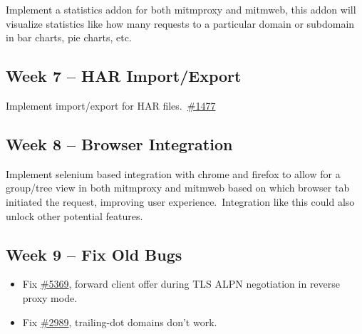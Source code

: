 Implement a statistics addon for both mitmproxy and mitmweb, this addon will visualize statistics like how many
requests to a particular domain or subdomain in bar charts, pie charts, etc.\


\subsection{Week 7 -- HAR Import/Export}
\label{subsec:week-7}

Implement import/export for HAR files.\ \href{https://github.com/mitmproxy/mitmproxy/issues/1477}{\#1477}


\subsection{Week 8 -- Browser Integration}
\label{subsec:week-8}

Implement selenium based integration with chrome and firefox to allow for a group/tree view in both mitmproxy and
mitmweb based on which browser tab initiated the request, improving user experience.\ Integration like this could
also unlock other potential features.


\subsection{Week 9 -- Fix Old Bugs}
\label{subsec:week-9}

\begin{itemize}

    \item Fix \href{https://github.com/mitmproxy/mitmproxy/issues/5369}{\#5369}, forward client offer during TLS
    ALPN negotiation in reverse proxy mode.\

    \item Fix \href{https://github.com/mitmproxy/mitmproxy/issues/2989}{\#2989}, trailing-dot domains don't work.

\end{itemize}


